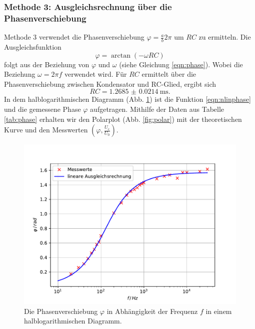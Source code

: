 \subsubsection{Methode 3: Ausgleichsrechnung über die Phasenverschiebung}
Methode 3 verwendet die Phasenverschiebung $\varphi = \frac{a}{b}2\pi$ um $RC$ zu ermitteln.
Die Ausgleichsfunktion
\begin{equation}
    \varphi = \arctan(-\omega RC)
    \label{eqn:nlinphase}
\end{equation}
folgt aus der Beziehung von $\varphi$ und $\omega$ (siehe Gleichung \ref{eqn:phase}).
Wobei die Beziehung $\omega = 2\pi f$ verwendet wird.
Für $RC$ ermittelt über die Phasenverschiebung zwischen Kondensator und RC-Glied, ergibt sich
\begin{equation*}
    RC = \SI{1.2685(214)}{\milli\second} .
\end{equation*}
In dem halblogarithmischen Diagramm (Abb. \ref{fig:phase}) ist die Funktion \ref{eqn:nlinphase} und die gemessene Phase $\varphi$ aufgetragen.
Mithilfe der Daten aus Tabelle \ref{tab:phase} erhalten wir den Polarplot (Abb. \ref{fig:polar}) mit der theoretischen Kurve und den Messwerten $(\varphi, \frac{U_\text{c}}{U_0})$.
\begin{figure}
    \centering
    \includegraphics[width=\textwidth]{content/data/plotc.pdf}
    \caption{Die Phasenverschiebung $\varphi$ in Abhängigkeit der Frequenz $f$ in einem halblogarithmischen Diagramm.}
    \label{fig:phase}
\end{figure}

